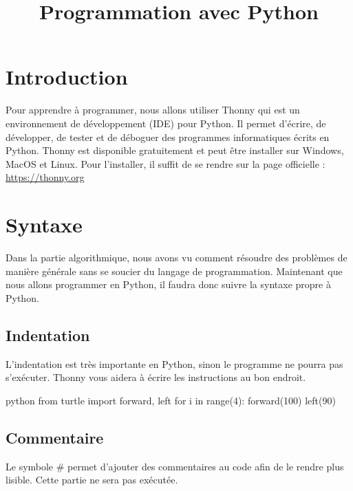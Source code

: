 \documentclass[a4paper,11pt]{article}
\begin{document}
\title{Programmation avec Python}
\date{}
\maketitle

\section{Introduction}
Pour apprendre à programmer, nous allons utiliser Thonny qui est un environnement de développement (IDE) pour Python. Il permet d’écrire, de développer, de tester et de déboguer des programmes informatiques écrits en Python.
Thonny est disponible gratuitement et peut être installer sur Windows, MacOS et Linux.
Pour l’installer, il suffit de se rendre sur la page officielle :  \url{https://thonny.org}

\section{Syntaxe}
Dans la partie algorithmique, nous avons vu comment résoudre des problèmes de manière générale sans se soucier du langage de programmation. Maintenant que nous allons programmer en Python, il faudra donc suivre la syntaxe propre à Python.

\subsection{Indentation}
L'indentation est très importante en Python, sinon le programme ne pourra pas s'exécuter. Thonny vous aidera à écrire les instructions au bon endroit.
\begin{code}{python}
from turtle import forward, left
for i in range(4):
    forward(100)
    left(90)
\end{code}

\subsection{Commentaire}
Le symbole \# permet d'ajouter des commentaires au code afin de le rendre plus lisible. Cette partie ne sera pas exécutée.
\end{document}
